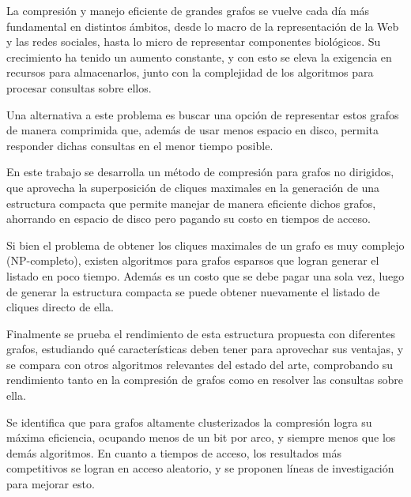 La compresión y manejo eficiente de grandes grafos se vuelve cada día más fundamental en distintos ámbitos, desde lo macro de la representación de la Web y las redes sociales, hasta lo micro de representar componentes biológicos. Su crecimiento ha tenido un aumento constante, y con esto se eleva la exigencia en recursos para almacenarlos, junto con la complejidad de los algoritmos para procesar consultas sobre ellos.

Una alternativa a este problema es buscar una opción de representar estos grafos de manera comprimida que, además de usar menos espacio en disco, permita responder dichas consultas en el menor tiempo posible.

En este trabajo se desarrolla un método de compresión para grafos no dirigidos, que aprovecha la superposición de cliques maximales en la generación de una estructura compacta que permite manejar de manera eficiente dichos grafos, ahorrando en espacio de disco pero pagando su costo en tiempos de acceso.

Si bien el problema de obtener los cliques maximales de un grafo es muy complejo (NP-completo), existen algoritmos para grafos esparsos que logran generar el listado en poco tiempo. Además es un costo que se debe pagar una sola vez, luego de generar la estructura compacta se puede obtener nuevamente el listado de cliques directo de ella.

Finalmente se prueba el rendimiento de esta estructura propuesta con diferentes grafos, estudiando qué características deben tener para aprovechar sus ventajas, y se compara con otros algoritmos relevantes del estado del arte, comprobando su rendimiento tanto en la compresión de grafos como en resolver las consultas sobre ella.

Se identifica que para grafos altamente clusterizados la compresión logra su máxima eficiencia, ocupando menos de un bit por arco, y siempre menos que los demás algoritmos. En cuanto a tiempos de acceso, los resultados más competitivos se logran en acceso aleatorio, y se proponen líneas de investigación para mejorar esto. 
